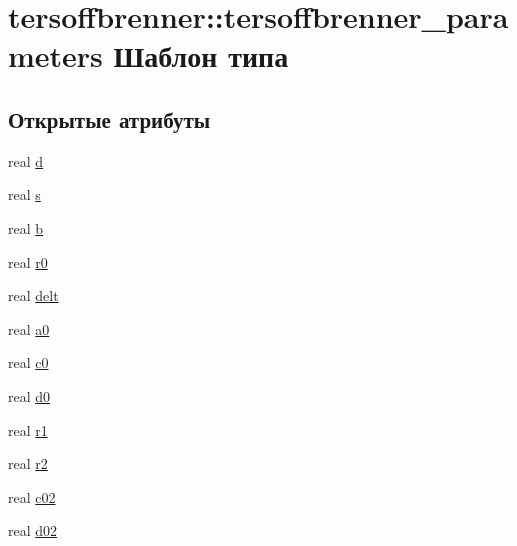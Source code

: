 \hypertarget{structtersoffbrenner_1_1tersoffbrenner__parameters}{}\section{tersoffbrenner\+:\+:tersoffbrenner\+\_\+parameters Шаблон типа}
\label{structtersoffbrenner_1_1tersoffbrenner__parameters}
\subsection*{Открытые атрибуты}
\begin{DoxyCompactItemize}
\item 
real \mbox{\hyperlink{structtersoffbrenner_1_1tersoffbrenner__parameters_acef75b2b91797c4969605eb1cdb952c0}{d}}
\item 
real \mbox{\hyperlink{structtersoffbrenner_1_1tersoffbrenner__parameters_af18f65cf8209e491d9bf5f5f2460c16a}{s}}
\item 
real \mbox{\hyperlink{structtersoffbrenner_1_1tersoffbrenner__parameters_a7cbe114b6ab1d5573a43c03dd129ca1f}{b}}
\item 
real \mbox{\hyperlink{structtersoffbrenner_1_1tersoffbrenner__parameters_a4dd76eb89188b13a6343a3d993b70713}{r0}}
\item 
real \mbox{\hyperlink{structtersoffbrenner_1_1tersoffbrenner__parameters_a99c669108c1e48be53a013664d1d2f8f}{delt}}
\item 
real \mbox{\hyperlink{structtersoffbrenner_1_1tersoffbrenner__parameters_af57f371983a89f1ce0cbbaf5e1ad0a85}{a0}}
\item 
real \mbox{\hyperlink{structtersoffbrenner_1_1tersoffbrenner__parameters_a8306c5d2b7e4ac210f984a820878e3a5}{c0}}
\item 
real \mbox{\hyperlink{structtersoffbrenner_1_1tersoffbrenner__parameters_a6c9944c3ac799355a617143d4ffa3932}{d0}}
\item 
real \mbox{\hyperlink{structtersoffbrenner_1_1tersoffbrenner__parameters_ac069565d22cdd9a07c82ef6b3dafcfe0}{r1}}
\item 
real \mbox{\hyperlink{structtersoffbrenner_1_1tersoffbrenner__parameters_a536f79432a422e5cb15e8776481536fc}{r2}}
\item 
real \mbox{\hyperlink{structtersoffbrenner_1_1tersoffbrenner__parameters_a135ba4d6105c661b01efec272573c305}{c02}}
\item 
real \mbox{\hyperlink{structtersoffbrenner_1_1tersoffbrenner__parameters_aa7b28e44128c35f4de3086e9f2392d67}{d02}}
\end{DoxyCompactItemize}


